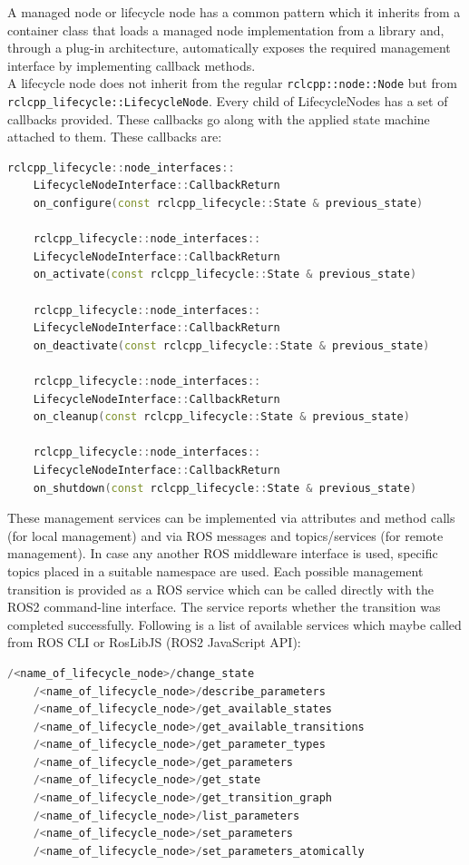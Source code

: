 	A managed node or lifecycle node has a common pattern which it inherits from a container class that loads a managed node implementation from a library and, through a plug-in architecture, automatically exposes the required management interface by implementing callback methods.\\ 

	A lifecycle node does not inherit from the regular \lstinline{rclcpp::node::Node} but from\\  \lstinline{rclcpp_lifecycle::LifecycleNode}. Every child of LifecycleNodes has a set of callbacks provided. These callbacks go along with the applied state machine attached to them. These callbacks are:

\begin{lstlisting}[language=cpp,
	caption={Transition Callbacks}, 
	label={code:TransitionCallbacks}]
	rclcpp_lifecycle::node_interfaces::
	LifecycleNodeInterface::CallbackReturn
	on_configure(const rclcpp_lifecycle::State & previous_state)

	rclcpp_lifecycle::node_interfaces::
	LifecycleNodeInterface::CallbackReturn
	on_activate(const rclcpp_lifecycle::State & previous_state)

	rclcpp_lifecycle::node_interfaces::
	LifecycleNodeInterface::CallbackReturn
	on_deactivate(const rclcpp_lifecycle::State & previous_state)

	rclcpp_lifecycle::node_interfaces::
	LifecycleNodeInterface::CallbackReturn
	on_cleanup(const rclcpp_lifecycle::State & previous_state)

	rclcpp_lifecycle::node_interfaces::
	LifecycleNodeInterface::CallbackReturn
	on_shutdown(const rclcpp_lifecycle::State & previous_state)

\end{lstlisting}

These management services can be implemented via attributes and method calls (for local management) and via ROS messages and topics/services (for remote management). In case any another ROS middleware interface is used, specific topics placed in a suitable namespace are used. Each possible management transition is provided as a ROS service which can be called directly with the ROS2 command-line interface. The service reports whether the transition was completed successfully. Following is a list of available services which maybe called from ROS CLI or RosLibJS (ROS2 JavaScript API): 

\begin{lstlisting}[language=cpp,
	caption={Available Services for a Lifecycle Node}, 
	label={code:ROS2:AvailableServices}]
	/<name_of_lifecycle_node>/change_state
	/<name_of_lifecycle_node>/describe_parameters
	/<name_of_lifecycle_node>/get_available_states
	/<name_of_lifecycle_node>/get_available_transitions
	/<name_of_lifecycle_node>/get_parameter_types
	/<name_of_lifecycle_node>/get_parameters
	/<name_of_lifecycle_node>/get_state
	/<name_of_lifecycle_node>/get_transition_graph
	/<name_of_lifecycle_node>/list_parameters
	/<name_of_lifecycle_node>/set_parameters
	/<name_of_lifecycle_node>/set_parameters_atomically
\end{lstlisting}

